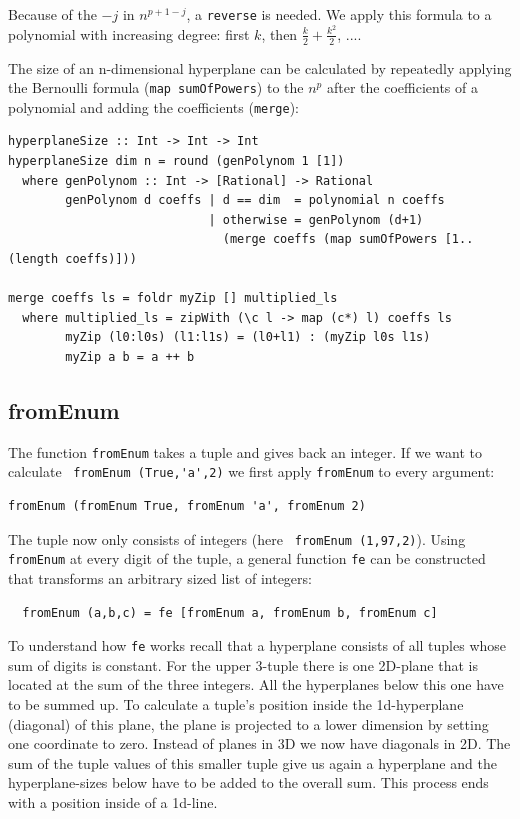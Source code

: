 \documentclass{tmr}
\newcommand{\authornote}[3]{{\color{#2} {\sc #1}: #3}}
\newcommand\bay[1]{\authornote{edward}{blue}{#1}}
\begin{document}
Because of the $-j$ in $n^{p+1-j}$, a \verb|reverse| is needed.
We apply this formula to a polynomial with increasing degree: first $k$, then $\frac{k}{2} + \frac{k^2}{2}$, ....

The size of an n-dimensional hyperplane can be calculated by repeatedly applying the Bernoulli formula (\verb|map sumOfPowers|) to the $n^p$ after the coefficients of a polynomial and adding the coefficients (\verb|merge|):

\small
\begin{Verbatim}
hyperplaneSize :: Int -> Int -> Int
hyperplaneSize dim n = round (genPolynom 1 [1])
  where genPolynom :: Int -> [Rational] -> Rational
        genPolynom d coeffs | d == dim  = polynomial n coeffs
                            | otherwise = genPolynom (d+1)
                              (merge coeffs (map sumOfPowers [1..(length coeffs)]))

merge coeffs ls = foldr myZip [] multiplied_ls
  where multiplied_ls = zipWith (\c l -> map (c*) l) coeffs ls
        myZip (l0:l0s) (l1:l1s) = (l0+l1) : (myZip l0s l1s)
        myZip a b = a ++ b
\end{Verbatim}

\subsection{fromEnum}

The function \verb|fromEnum| takes a tuple and gives back an integer. If we want to calculate \eg \ \verb|fromEnum (True,'a',2)| we first apply \verb|fromEnum| to every argument: 

\begin{Verbatim}
fromEnum (fromEnum True, fromEnum 'a', fromEnum 2)
\end{Verbatim}

The tuple now only consists of integers (here \verb| fromEnum (1,97,2)|).
Using \verb|fromEnum| at every digit of the tuple, a general function \verb|fe| can be constructed that transforms an arbitrary sized list of integers: %

\begin{Verbatim}
  fromEnum (a,b,c) = fe [fromEnum a, fromEnum b, fromEnum c]
\end{Verbatim}

To understand how \verb|fe| works recall that a hyperplane consists of all tuples whose sum of digits is constant. For the upper 3-tuple there is one 2D-plane that is located at the sum of the three integers. All the hyperplanes below this one have to be summed up. To calculate a tuple's position inside the 1d-hyperplane (diagonal) of this plane, the plane is projected to a lower dimension by setting one coordinate to zero. Instead of planes in 3D we now have diagonals in 2D. The sum of the tuple values of this smaller tuple give us again a hyperplane and the  hyperplane-sizes below have to be added to the overall sum. This process ends with a position inside of a 1d-line.
\end{document}
